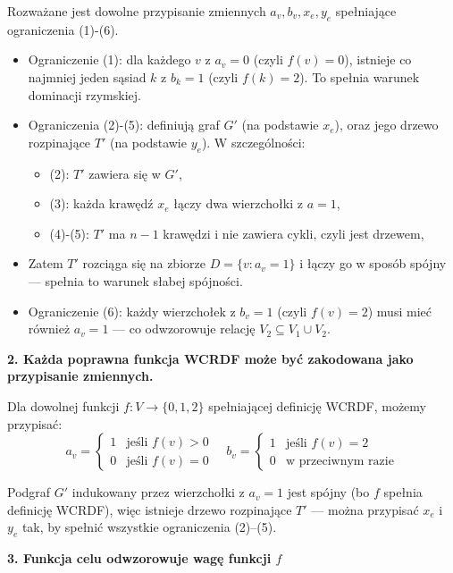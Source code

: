 Rozważane jest dowolne przypisanie zmiennych $a_v, b_v, x_e, y_e$ spełniające ograniczenia (1)-(6).

\begin{itemize}
    \item Ograniczenie (1): dla każdego $v$ z $a_v = 0$ (czyli $f(v) = 0$), istnieje co najmniej jeden sąsiad $k$ z $b_k = 1$ (czyli $f(k) = 2$). To spełnia warunek dominacji rzymskiej.
    
    \item Ograniczenia (2)-(5): definiują graf $G'$ (na podstawie $x_e$), oraz jego drzewo rozpinające $T'$ (na podstawie $y_e$). W szczególności:
    \begin{itemize}
        \item (2): $T'$ zawiera się w $G'$,
        \item (3): każda krawędź $x_e$ łączy dwa wierzchołki z $a = 1$,
        \item (4)-(5): $T'$ ma $n-1$ krawędzi i nie zawiera cykli, czyli jest drzewem,
    \end{itemize}
    \item Zatem $T'$ rozciąga się na zbiorze $D = \{v : a_v = 1\}$ i łączy go w sposób spójny — spełnia to warunek słabej spójności.
    
    \item Ograniczenie (6): każdy wierzchołek z $b_v = 1$ (czyli $f(v) = 2$) musi mieć również $a_v = 1$ — co odwzorowuje relację $V_2 \subseteq V_1 \cup V_2$.
\end{itemize}

\textbf{2. Każda poprawna funkcja WCRDF może być zakodowana jako przypisanie zmiennych.}

Dla dowolnej funkcji $f : V \to \{0,1,2\}$ spełniającej definicję WCRDF, możemy przypisać:
\[
a_v = \begin{cases}
1 & \text{jeśli } f(v) > 0 \\
0 & \text{jeśli } f(v) = 0
\end{cases}
\quad
b_v = \begin{cases}
1 & \text{jeśli } f(v) = 2 \\
0 & \text{w przeciwnym razie}
\end{cases}
\]

Podgraf $G'$ indukowany przez wierzchołki z $a_v = 1$ jest spójny (bo $f$ spełnia definicję WCRDF), więc istnieje drzewo rozpinające $T'$ — można przypisać $x_e$ i $y_e$ tak, by spełnić wszystkie ograniczenia (2)–(5).

\textbf{3. Funkcja celu odwzorowuje wagę funkcji $f$}

